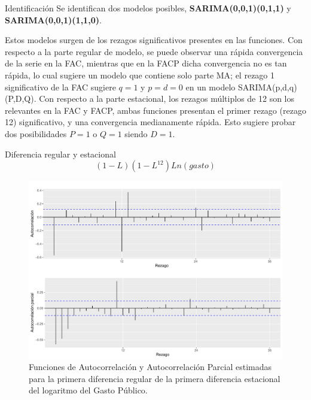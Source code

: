 \documentclass[
  ignorenonframetext,
]{beamer}
\begin{document}
\begin{frame}{Identificación}
\protect\hypertarget{identificaciuxf3n}{}
Se identifican dos modelos posibles, \textbf{SARIMA(0,0,1)(0,1,1)} y
\textbf{SARIMA(0,0,1)(1,1,0)}.

Estos modelos surgen de los rezagos significativos presentes en las
funciones. Con respecto a la parte regular de modelo, se puede observar
una rápida convergencia de la serie en la FAC, mientras que en la FACP
dicha convergencia no es tan rápida, lo cual sugiere un modelo que
contiene solo parte MA; el rezago 1 significativo de la FAC sugiere
\(q=1\) y \(p=d=0\) en un modelo SARIMA(p,d,q)(P,D,Q). Con respecto a la
parte estacional, los rezagos múltiplos de 12 son los relevantes en la
FAC y FACP, ambas funciones presentan el primer rezago (rezago 12)
significativo, y una convergencia medianamente rápida. Esto sugiere
probar dos posibilidades \(P=1\) o \(Q=1\) siendo \(D=1\).
\end{frame}

\begin{frame}{Diferencia regular y estacional}
\protect\hypertarget{diferencia-regular-y-estacional}{}
\[(1-L)(1-L^{12}) Ln(gasto)\]

\begin{figure}[H]

{\centering \includegraphics[width=0.7\linewidth]{presentacion_files/figure-beamer/unnamed-chunk-5-1} 

}

\caption{\label{dd_fac_facp} Funciones de Autocorrelación y Autocorrelación Parcial estimadas para la primera diferencia regular de la primera diferencia estacional del logaritmo del Gasto Público.}\label{fig:unnamed-chunk-5}
\end{figure}
\end{frame}
\end{document}
